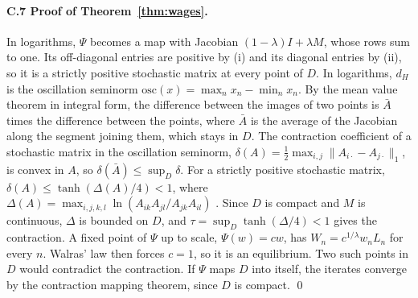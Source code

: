 \documentclass[11pt]{article}
\theoremstyle{definition}
\theoremstyle{remark}
\begin{document}
\paragraph{C.7 Proof of Theorem~\ref{thm:wages}.} In logarithms, $\Psi$ becomes a map
with Jacobian $(1-\lambda)I+\lambda M$, whose rows sum to one. Its off-diagonal entries
are positive by (i) and its diagonal entries by (ii), so it is a strictly positive
stochastic matrix at every point of $D$. In logarithms, $d_H$ is the oscillation
seminorm $\mathrm{osc}(x)=\max_nx_n-\min_nx_n$. By the mean value theorem in integral
form, the difference between the images of two points is $\bar A$ times the difference
between the points, where $\bar A$ is the average of the Jacobian along the segment
joining them, which stays in $D$. The contraction coefficient of a stochastic matrix in
the oscillation seminorm, $\delta(A)=\frac12\max_{i,j}\|A_{i\cdot}-A_{j\cdot}\|_1$, is
convex in $A$, so $\delta(\bar A)\le\sup_D\delta$. For a strictly positive stochastic
matrix, $\delta(A)\le\tanh(\Delta(A)/4)<1$, where
$\Delta(A)=\max_{i,j,k,l}\ln(A_{ik}A_{jl}/A_{jk}A_{il})$
\citep{Birkhoff1957,Seneta2006}. Since $D$ is compact and $M$ is continuous, $\Delta$ is
bounded on $D$, and $\tau=\sup_D\tanh(\Delta/4)<1$ gives the contraction. A fixed point
of $\Psi$ up to scale, $\Psi(w)=cw$, has $W_n=c^{1/\lambda}w_nL_n$ for every $n$. Walras'
law then forces $c=1$, so it is an equilibrium. Two such points in $D$ would contradict
the contraction. If $\Psi$ maps $D$ into itself, the iterates converge by the
contraction mapping theorem, since $D$ is compact. \qed
\end{document}
